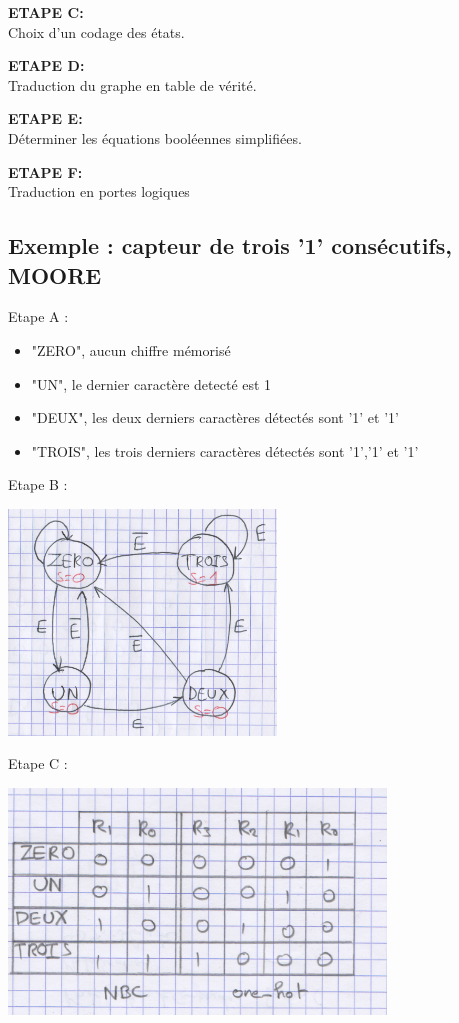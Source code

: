{\bf ETAPE C:}\\
Choix d'un codage des états.

{\bf ETAPE D:}\\
Traduction du graphe en table de vérité.

{\bf ETAPE E:}\\
Déterminer les équations booléennes simplifiées.

{\bf ETAPE F:}\\
Traduction en portes logiques

\subsection{Exemple : capteur de trois '1' consécutifs, MOORE}

Etape A :
\begin{itemize}
  \item "ZERO", aucun chiffre mémorisé
  \item "UN", le dernier caractère detecté est 1
  \item "DEUX", les deux derniers caractères détectés sont '1' et '1'
  \item "TROIS", les trois derniers caractères détectés sont '1','1' et '1'
\end{itemize}

Etape B :\\
\begin{center}
  \includegraphics[height=6cm]{cours1/pics/graph2.png}
\end{center}

Etape C :
\begin{center}
  \includegraphics[height=6cm]{cours1/pics/truthtable.png}
\end{center}

